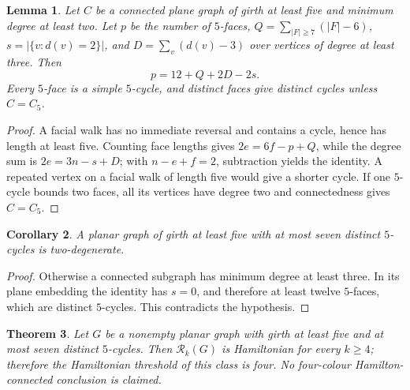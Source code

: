 \documentclass[11pt]{article}
\newtheorem{theorem}{Theorem}[section]
\newtheorem{lemma}[theorem]{Lemma}
\newtheorem{corollary}[theorem]{Corollary}
\theoremstyle{remark}
\newcommand{\Rk}{\mathcal R_k}
\numberwithin{equation}{section}
\numberwithin{table}{section}
\begin{document}
\begin{lemma}
\label{lem:five-face-identity-subclass}
Let $C$ be a connected plane graph of girth at least five and minimum degree
at least two.  Let $p$ be the number of $5$-faces,
$Q=\sum_{|F|\ge7}(|F|-6)$, $s=|\{v:d(v)=2\}|$, and
$D=\sum_v(d(v)-3)$ over vertices of degree at least three.  Then
\[
 p=12+Q+2D-2s.
\]
Every $5$-face is a simple $5$-cycle, and distinct faces give distinct
cycles unless $C=C_5$.
\end{lemma}

\begin{proof}
A facial walk has no immediate reversal and contains a cycle, hence has
length at least five.  Counting face lengths gives
$2e=6f-p+Q$, while the degree sum is $2e=3n-s+D$; with $n-e+f=2$,
subtraction yields the identity.  A repeated vertex on a facial walk of
length five would give a shorter cycle.  If one $5$-cycle bounds two faces,
all its vertices have degree two and connectedness gives $C=C_5$.
\end{proof}

\begin{corollary}
\label{cor:seven-pentagons-two-degenerate}
A planar graph of girth at least five with at most seven distinct $5$-cycles
is two-degenerate.
\end{corollary}

\begin{proof}
Otherwise a connected subgraph has minimum degree at least three.  In its
plane embedding the identity has $s=0$, and therefore at least twelve
$5$-faces, which are distinct $5$-cycles.  This contradicts the hypothesis.
\end{proof}

\begin{theorem}
\label{thm:seven-pentagons}
Let $G$ be a nonempty planar graph with girth at least five and at most
seven distinct $5$-cycles.  Then $\Rk(G)$ is Hamiltonian for every $k\ge4$;
therefore the Hamiltonian threshold of this class is four.  No
four-colour Hamilton-connected conclusion is claimed.
\end{theorem}
\end{document}
